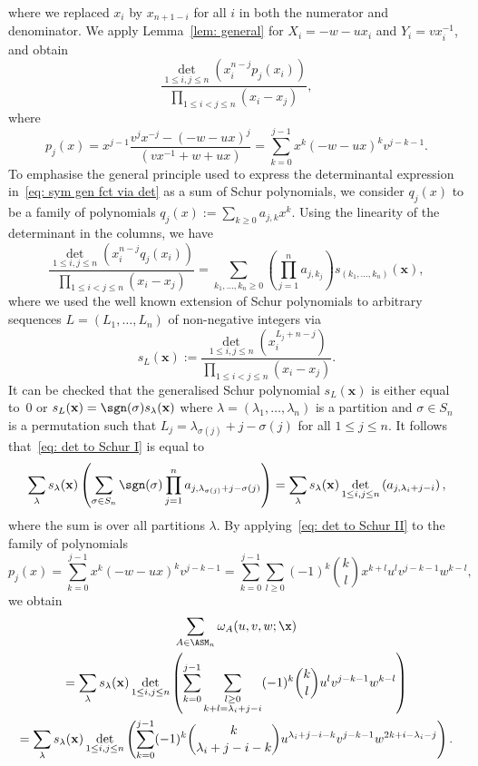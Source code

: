 where we replaced $x_i$ by $x_{n+1-i}$ for all $i$ in both the numerator and denominator.
We apply Lemma~\ref{lem: general} for $X_i=-w-u x_i$ and $Y_i=v x_i^{-1}$, 
and obtain
\begin{equation}
\label{eq: sym gen fct via det}
\frac{\det_{1 \leq i,j \leq n}\left( x_i^{n-j}p_j(x_i) \right)}{\prod_{1 \leq i < j \leq n}(x_i-x_j)},
\end{equation}
where 
\[
p_j(x) = x^{j-1}\frac{v^j x^{-j}-\left( -w-u x\right)^j}{(v x^{-1}+w+u x)}
= \sum\limits_{k=0}^{j-1}x^k(-w-u x)^k  v^{j-k-1}.
\]
 To emphasise the general principle used to express the determinantal expression in~\eqref{eq: sym gen fct via det} as a sum of Schur polynomials, we consider $q_j(x)$ to be a family of polynomials $q_j(x):= \sum_{k\geq 0} a_{j,k} x^k$.
Using the linearity of the determinant in the columns, we have
\begin{equation}
\label{eq: det to Schur I}
\frac{\det\limits_{1 \leq i,j \leq n}\left( x_i^{n-j}q_j(x_i) \right)}{\prod\limits_{1 \leq i< j \leq n}(x_i-x_j)}
= \sum\limits_{k_1,\ldots,k_n \geq 0} \left( \prod_{j=1}^n a_{j,k_j} \right) s_{(k_1,\ldots, k_n)}(\mathbf{x}),
\end{equation}
where we used the well known extension of Schur polynomials to arbitrary sequences $L=(L_1,\ldots,L_n)$ of non-negative integers via
\[
s_{L}(\mathbf{x}) := \frac{\det\limits_{1 \leq i,j \leq n}\left( x_i^{L_j+n-j}\right)}{\prod\limits_{1 \leq i < j \leq n}(x_i-x_j)}.
\]
It can be checked that the generalised Schur polynomial $s_L(\mathbf{x})$ is either equal to~$0$ or $s_L(\mathbf{x})= \sgn(\sigma) s_\lambda(\mathbf{x})$ where $\lambda=(\lambda_1,\ldots, \lambda_n)$ is a partition 
and $\sigma \in S_n$ is a permutation such that $L_j=\lambda_{\sigma(j)}+j-\sigma(j)$ for all $1 \leq j \leq n$. It follows that~\eqref{eq: det to Schur I} is equal to
\begin{equation}
\label{eq: det to Schur II}
 \sum_{\lambda} s_\lambda(\mathbf{x}) \left( \sum_{\sigma \in S_n} \sgn(\sigma) \prod_{j=1}^n a_{j,\lambda_{\sigma(j)}+j-\sigma(j)}  \right)
= \sum_{\lambda} s_\lambda(\mathbf{x}) \det\limits_{1 \leq i,j \leq n} \left( a_{j,\lambda_i+j-i} \right),
\end{equation}
where the sum is over all partitions $\lambda$.
By applying~\eqref{eq: det to Schur II} to the family of polynomials 
\[
p_{j}(x) 
=\sum\limits_{k=0}^{j-1}x^k(-w-u x)^k  v^{j-k-1}
= \sum\limits_{k=0}^{j-1} \sum\limits_{l\geq 0}
(-1)^{k}\binom{k}{l} x^{k+l}   u^lv^{j-k-1} w^{k-l}
,
\]
we obtain
\begin{multline*}
\sum_{A \in \ASM_n}\omega_A(u,v,w;\x) \\=
\sum_\lambda s_\lambda(\mathbf{x}) \det\limits_{1 \leq i,j \leq n} \left( 
\sum\limits_{k=0}^{j-1}  \sum\limits_{\substack{l \geq 0 \\ k+l = \lambda_i+j-i}}
(-1)^{k}\binom{k}{l}   u^lv^{j-k-1} w^{k-l}
\right)\\
= \sum_\lambda s_\lambda(\mathbf{x})  \det_{1 \leq i,j \leq n} \left(
\sum_{k=0}^{j-1} (-1)^{k}\binom{k}{\lambda_i+j-i-k} u^{\lambda_i+j-i-k} v^{j-k-1} w^{2k+i-\lambda_i-j}
\right).
\end{multline*}

